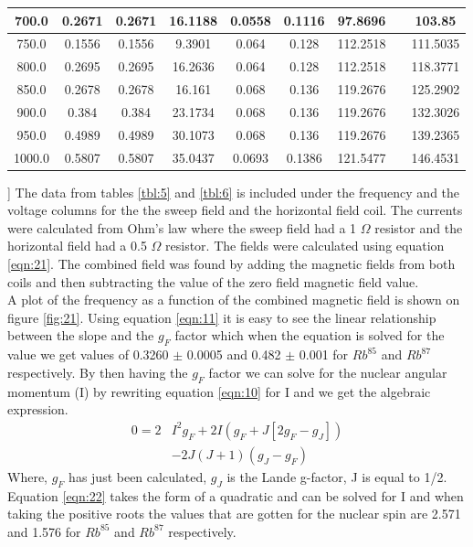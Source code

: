 \documentclass[twocolumn]{article}
\begin{document}
\begin{@twocolumnfalse}
\begin{tabular}{|c|c|c|c|c|c|c|c|c|}
700.0 & 0.2671 & 0.2671 & 16.1188 & 0.0558 & 0.1116 & 97.8696 && 103.85 \\ \hline
750.0 & 0.1556 & 0.1556 & 9.3901 & 0.064 & 0.128 & 112.2518 && 111.5035 \\ \hline
800.0 & 0.2695 & 0.2695 & 16.2636 & 0.064 & 0.128 & 112.2518 && 118.3771 \\ \hline
850.0 & 0.2678 & 0.2678 & 16.161 & 0.068 & 0.136 & 119.2676 && 125.2902 \\ \hline
900.0 & 0.384 & 0.384 & 23.1734 & 0.068 & 0.136 & 119.2676 && 132.3026 \\ \hline
950.0 & 0.4989 & 0.4989 & 30.1073 & 0.068 & 0.136 & 119.2676 && 139.2365 \\ \hline
1000.0 & 0.5807 & 0.5807 & 35.0437 & 0.0693 & 0.1386 & 121.5477 && 146.4531 \\ \hline
\end{tabular}
\label{tbl:7}
\end{@twocolumnfalse}]
The data from tables \ref{tbl:5} and \ref{tbl:6} is included under the 
frequency and the voltage columns for the the sweep field and the horizontal 
field coil. The currents were calculated from Ohm's law where the sweep field 
had a 1 $\Omega$ resistor and the horizontal field had a 0.5 $\Omega$ resistor. 
The fields were calculated using equation \ref{eqn:21}. The combined field was 
found by adding the magnetic fields from both coils and then subtracting the 
value of the zero field magnetic field value. 
\\
A plot of the frequency as a function of the combined magnetic field is shown 
on figure \ref{fig:21}. Using equation \ref{eqn:11} it is easy to see the 
linear relationship between the slope and the $g_F$ factor which when the 
equation is solved for the value we get values of 0.3260 $\pm$ 0.0005 and 0.482 
$\pm$ 0.001 for $Rb^{85}$ and $Rb^{87}$ respectively. By then having the $g_F$ 
factor we can solve for the nuclear angular momentum (I) by rewriting equation 
\ref{eqn:10} for I and we get the algebraic expression.
\begin{equation}
\begin{aligned}
0 = 2&I^2g_F + 2I\left(g_F+J\left[2g_F-g_J\right]\right)
\\
      &- 2J\left(J+1\right)\left(g_J-g_F\right)
\label{eqn:22}
\end{aligned}
\end{equation}
Where, $g_F$ has just been calculated, $g_J$ is the Lande g-factor, J is equal 
to 1/2. Equation \ref{eqn:22} takes the form of a quadratic and can be solved 
for I and when taking the positive roots the values that are gotten for the 
nuclear spin are 2.571 and 1.576 for $Rb^{85}$ and $Rb^{87}$ respectively.
\end{document}
